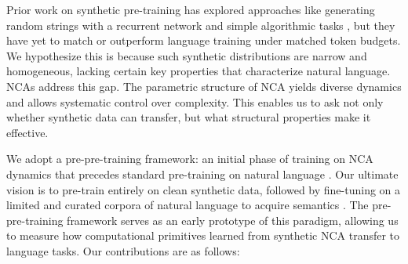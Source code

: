 \documentclass{article}
\newcommand{\dl}[1]{\textcolor{violet}{DL: #1}}
\theoremstyle{plain}
\theoremstyle{definition}
\theoremstyle{remark}
\begin{document}
Prior work on synthetic pre-training has explored approaches like generating random strings with a recurrent network \citep{bloem2025universalpretrainingiteratedrandom} and simple algorithmic tasks \citep{wu2022insightspretrainingsimplersynthetic, shinnick2025transformers}, but they have yet to match or outperform language training under matched token budgets. We hypothesize this is because such synthetic distributions are narrow and homogeneous, lacking certain key properties that characterize natural language. NCAs address this gap. The parametric structure of NCA yields diverse dynamics and allows systematic control over complexity. This enables us to ask not only whether synthetic data can transfer, but what structural properties make it effective.

We adopt a pre-pre-training framework: an initial phase of training on NCA dynamics that precedes standard pre-training on natural language \citep{hu2025circuitschomskyprepretrainingformal}.
Our ultimate vision is to pre-train entirely on clean synthetic data, followed by fine-tuning on a limited and curated corpora of natural language to acquire semantics \citep{han2025generalintelligencerequiresrewardbased}. The pre-pre-training framework serves as an early prototype of this paradigm, allowing us to measure how computational primitives learned from synthetic NCA transfer to language tasks. Our contributions are as follows: 



\end{document}
